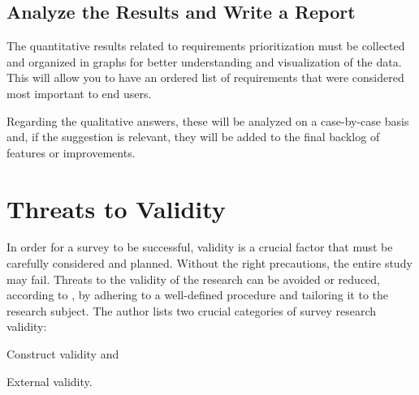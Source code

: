 \subsection{Analyze the Results and Write a Report}\label{sec:survey-analyse}

The quantitative results related to requirements prioritization must be collected and organized in graphs for better understanding and visualization of the data.
This will allow you to have an ordered list of requirements that were considered most important to end users.


Regarding the qualitative answers, these will be analyzed on a case-by-case basis and, if the suggestion is relevant, they will be added to the final backlog of features or improvements.
\section{Threats to Validity}\label{sec:survey-threats}

In order for a survey to be successful, validity is a crucial factor that must be carefully considered and planned. Without the right precautions, the entire study may fail. Threats to the validity of the research can be avoided or reduced, according to \textcite{kasunic2005designing}, by adhering to a well-defined procedure and tailoring it to the research subject. The author lists two crucial categories of survey research validity:
\begin{inparaenum}[(1)]
  \item Construct validity and
  \item External validity.
\end{inparaenum}

